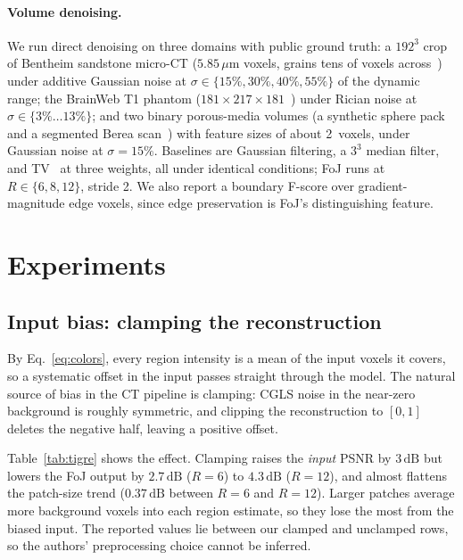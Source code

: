 \documentclass[11pt]{article}
\newcommand{\dB}{\,\mathrm{dB}}
\begin{document}
\paragraph{Volume denoising.}
We run direct denoising on three domains with public ground truth: a
$192^3$ crop of Bentheim sandstone micro-CT ($5.85\,\mu\mathrm{m}$
voxels, grains tens of voxels across~\cite{bentheim2015zenodo}) under
additive Gaussian noise at $\sigma\in\{15\%,30\%,40\%,55\%\}$ of the
dynamic range; the BrainWeb T1 phantom
($181{\times}217{\times}181$~\cite{collins1998brainweb}) under Rician
noise at $\sigma\in\{3\%\ldots13\%\}$; and two binary porous-media
volumes (a synthetic sphere pack and a segmented Berea
scan~\cite{neumann2020sandstones}) with feature sizes of about 2~voxels,
under Gaussian noise at $\sigma{=}15\%$. Baselines are Gaussian
filtering, a $3^3$ median filter, and
TV~\cite{rudin1992nonlinear,chambolle2004algorithm} at three weights, all under
identical conditions; FoJ runs at $R\in\{6,8,12\}$, stride 2. We also
report a boundary F-score over gradient-magnitude edge voxels, since edge
preservation is FoJ's distinguishing feature.

\section{Experiments}
\label{sec:experiments}

\subsection{Input bias: clamping the reconstruction}
\label{sec:bias}

By Eq.~\eqref{eq:colors}, every region intensity is a mean of the input
voxels it covers, so a systematic offset in the input passes straight
through the model. The natural source of bias in the CT pipeline is
clamping: CGLS noise in the near-zero background is roughly symmetric,
and clipping the reconstruction to $[0,1]$ deletes the negative half,
leaving a positive offset.

Table~\ref{tab:tigre} shows the effect. Clamping raises the \emph{input}
PSNR by $3\dB$ but lowers the FoJ output by $2.7\dB$ ($R{=}6$) to
$4.3\dB$ ($R{=}12$), and almost flattens the patch-size trend
($0.37\dB$ between $R{=}6$ and $R{=}12$). Larger patches average more
background voxels into each region estimate, so they lose the most from
the biased input. The reported values lie between our clamped and
unclamped rows, so the authors' preprocessing choice cannot be inferred.
\end{document}
